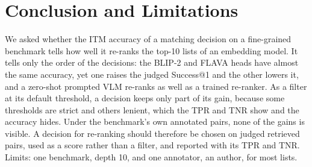 \section{Conclusion and Limitations}
\label{sec:conclusion}

We asked whether the ITM accuracy of a matching decision on a fine-grained benchmark tells how well it re-ranks the top-10 lists of an embedding model. It tells only the order of the decisions: the BLIP-2 and FLAVA heads have almost the same accuracy, yet one raises the judged Success@1 and the other lowers it, and a zero-shot prompted VLM re-ranks as well as a trained re-ranker. As a filter at its default threshold, a decision keeps only part of its gain, because some thresholds are strict and others lenient, which the TPR and TNR show and the accuracy hides. Under the benchmark's own annotated pairs, none of the gains is visible. A decision for re-ranking should therefore be chosen on judged retrieved pairs, used as a score rather than a filter, and reported with its TPR and TNR. Limits: one benchmark, depth 10, and one annotator, an author, for most lists.
